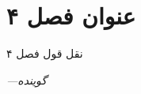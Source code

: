 \chapter{عنوان فصل ۴}
\setlength{\epigraphwidth}{1.08\textwidth}
\epigraph{نقل قول فصل ۴}{\textit{—گوینده}}
\setcounter{footnote}{0}
